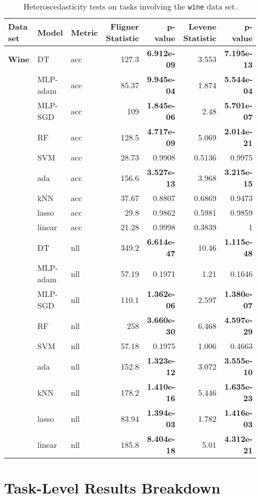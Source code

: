 \documentclass[jair,twoside,11pt,theapa]{article}
\theoremstyle{definition}
\begin{document}
\begin{table*}
\centering
\caption{Heteroscedasticity tests on tasks involving the \texttt{wine} data set.}
\label{tab:search-spacehetero-tests-wine}
\begin{tabular}{lllrrrr}
\toprule
Data set & Model & Metric & Fligner Statistic & p-value &  Levene Statistic & p-value \\ 
\midrule
\textbf{Wine} & DT & acc & 127.3 & \textbf{6.912e-09} & 3.553 & \textbf{7.195e-13} \\ 
  & MLP-adam & acc & 85.37 & \textbf{9.945e-04} & 1.874 & \textbf{5.544e-04} \\ 
  & MLP-SGD & acc & 109 & \textbf{1.845e-06} & 2.48 & \textbf{5.701e-07} \\ 
  & RF & acc & 128.5 & \textbf{4.717e-09} & 5.069 & \textbf{2.014e-21} \\ 
  & SVM & acc & 28.73 & 0.9908 & 0.5136 & 0.9975 \\ 
  & ada & acc & 156.6 & \textbf{3.527e-13} & 3.968 & \textbf{3.215e-15} \\ 
  & kNN & acc & 37.67 & 0.8807 & 0.6869 & 0.9473 \\ 
  & lasso & acc & 29.8 & 0.9862 & 0.5981 & 0.9859 \\ 
  & linear & acc & 21.28 & 0.9998 & 0.3839 & 1 \\ 
  & DT & nll & 349.2 & \textbf{6.614e-47} & 10.46 & \textbf{1.115e-48} \\ 
  & MLP-adam & nll & 57.19 & 0.1971 & 1.21 & 0.1646 \\ 
  & MLP-SGD & nll & 110.1 & \textbf{1.362e-06} & 2.597 & \textbf{1.380e-07} \\ 
  & RF & nll & 258 & \textbf{3.660e-30} & 6.468 & \textbf{4.597e-29} \\ 
  & SVM & nll & 57.18 & 0.1975 & 1.006 & 0.4663 \\ 
  & ada & nll & 152.8 & \textbf{1.323e-12} & 3.072 & \textbf{3.555e-10} \\ 
  & kNN & nll & 178.2 & \textbf{1.410e-16} & 5.446 & \textbf{1.635e-23} \\ 
  & lasso & nll & 83.94 & \textbf{1.394e-03} & 1.782 & \textbf{1.416e-03} \\ 
  & linear & nll & 185.8 & \textbf{8.404e-18} & 5.01 & \textbf{4.312e-21} \\ 
\bottomrule
\end{tabular}
\end{table*}

\section{Task-Level Results Breakdown}\label{fig:summary_all_models}
\end{document}
